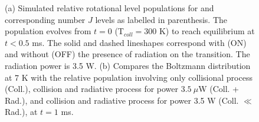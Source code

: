 \begin{figure}[!htb]
    \hfill
    
    \caption{(a) Simulated relative rotational level populations for \CD and corresponding number $J$ levels as labelled in parenthesis. The population evolves from $t=0$ (T$_{coll}=300$ K) to reach equilibrium at $t<0.5$ ms. The solid and dashed lineshapes correspond with (ON) and without (OFF) the presence of radiation on the \CD \CDline transition. The radiation power is 3.5 W. (b) Compares the Boltzmann distribution at 7 K with the relative population involving only collisional process (Coll.), collision and radiative process for power $3.5\ \mu$W (Coll. + Rad.), and collision and radiative process for power 3.5 W (Coll. $\ll$ Rad.), at $t=1$ ms.}
    \label{fig:ROSAA-sim-coll-rad-population-boltzmann-higher-rad}
\end{figure}
